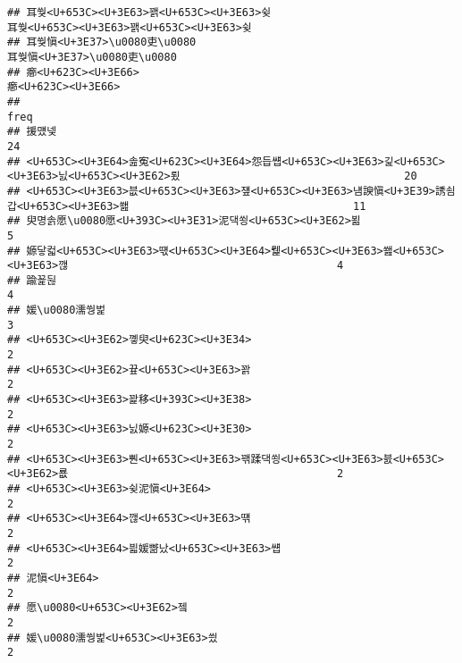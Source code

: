 \documentclass[]{article}
\begin{document}
\begin{verbatim}
## 耳쒖<U+653C><U+3E63>꽭<U+653C><U+3E63>슂                                                                                                                                                                     耳쒖<U+653C><U+3E63>꽭<U+653C><U+3E63>슂
## 耳쒖愼<U+3E37>\u0080吏\u0080                                                                                                                                                                           耳쒖愼<U+3E37>\u0080吏\u0080
## 癤<U+623C><U+3E66>                                                                                                                                                                                                     癤<U+623C><U+3E66>
##                                                                      freq
## 援먰넻                                                                 24
## <U+653C><U+3E64>솚寃<U+623C><U+3E64>怨듭썝<U+653C><U+3E63>긽<U+653C><U+3E63>닔<U+653C><U+3E62>룄                                   20
## <U+653C><U+3E63>븞<U+653C><U+3E63>쟾<U+653C><U+3E63>냼諛愼<U+3E39>誘쇰갑<U+653C><U+3E63>쐞                                   11
## 臾명솕愿\u0080愿<U+393C><U+3E31>泥댁쑁<U+653C><U+3E62>뵒                                        5
## 嫄닿컯<U+653C><U+3E63>떇<U+653C><U+3E64>뭹<U+653C><U+3E63>쐞<U+653C><U+3E63>깮                                          4
## 踰꾩뒪                                                                  4
## 媛\u0080濡쒕벑                                                          3
## <U+653C><U+3E62>꼫臾<U+623C><U+3E34>                                                            2
## <U+653C><U+3E62>끂<U+653C><U+3E63>꽑                                                            2
## <U+653C><U+3E63>꽕移<U+393C><U+3E38>                                                            2
## <U+653C><U+3E63>닔嫄<U+623C><U+3E30>                                                            2
## <U+653C><U+3E63>뿬<U+653C><U+3E63>꽦蹂댁쑁<U+653C><U+3E63>븘<U+653C><U+3E62>룞                                          2
## <U+653C><U+3E63>슂泥愼<U+3E64>                                                            2
## <U+653C><U+3E64>깮<U+653C><U+3E63>떆                                                            2
## <U+653C><U+3E64>븳媛뺢났<U+653C><U+3E63>썝                                                      2
## 泥愼<U+3E64>                                                                  2
## 愿\u0080<U+653C><U+3E62>젴                                                          2
## 媛\u0080濡쒕벑<U+653C><U+3E63>씠                                                    2

\end{verbatim}
\end{document}

